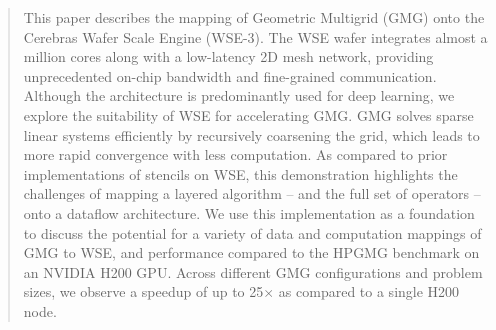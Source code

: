 \documentclass[sigconf]{acmart}
\begin{document}
\begin{abstract}
    This paper describes the mapping of Geometric Multigrid (GMG) onto the Cerebras Wafer Scale Engine (WSE-3).  The WSE wafer integrates almost a million cores along with a low-latency 2D mesh network, providing unprecedented on-chip bandwidth and fine-grained communication. Although the architecture is predominantly used for deep learning, we explore the suitability of WSE for accelerating GMG. %
    GMG solves sparse linear systems efficiently by recursively coarsening the grid, %
    which leads to more rapid convergence with less computation.
    As compared to prior implementations of stencils on WSE, this demonstration highlights the challenges of mapping a layered algorithm -- and the full set of operators -- onto a dataflow architecture.  We use this implementation as a foundation to discuss the potential for a variety of data and computation mappings of GMG to WSE, and performance compared to the HPGMG benchmark on an NVIDIA H200 GPU.  Across different GMG configurations and problem sizes, we observe a speedup of up to 25$\times$ as compared to a single H200 node.  
\end{abstract}

\end{document}
